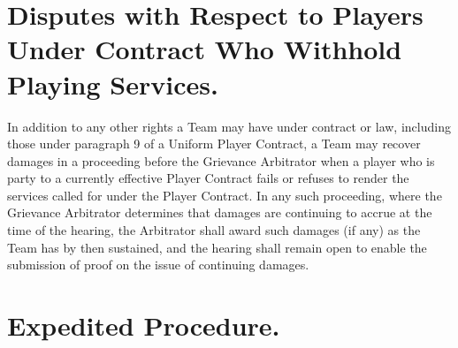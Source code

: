 \documentclass[
]{book}
\begin{document}
\hypertarget{disputes-with-respect-to-players-under-contract-who-withhold-playing-services.}{%
\section{Disputes with Respect to Players Under Contract Who Withhold Playing Services.}\label{disputes-with-respect-to-players-under-contract-who-withhold-playing-services.}}

In addition to any other rights a Team may have under contract or law, including those under paragraph 9 of a Uniform Player Contract, a Team may recover damages in a proceeding before the Grievance Arbitrator when a player who is party to a currently effective Player Contract fails or refuses to render the services called for under the Player Contract. In any such proceeding, where the Grievance Arbitrator determines that damages are continuing to accrue at the time of the hearing, the Arbitrator shall award such damages (if any) as the Team has by then sustained, and the hearing shall remain open to enable the submission of proof on the issue of continuing damages.

\hypertarget{expedited-procedure.}{%
\section{Expedited Procedure.}\label{expedited-procedure.}}
\end{document}
